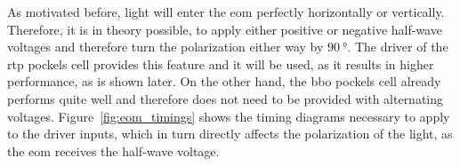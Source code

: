 \begin{figure}[tbp]%
\end{figure}

As motivated before, light will enter the \ac{eom} perfectly horizontally or vertically. Therefore, it is in theory possible, to apply either positive or negative half-wave voltages and therefore turn the polarization either way by $\SI{90}{\degree}$. The driver of the \ac{rtp} pockels cell provides this feature and it will be used, as it results in higher performance, as is shown later. On the other hand, the \ac{bbo} pockels cell already performs quite well and therefore does not need to be provided with alternating voltages. Figure~\ref{fig:eom_timings} shows the timing diagrams necessary to apply to the driver inputs, which in turn directly affects the polarization of the light, as the \ac{eom} receives the half-wave voltage.

